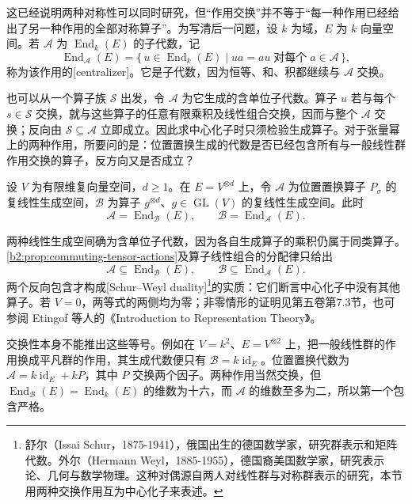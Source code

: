 这已经说明两种对称性可以同时研究，但“作用交换”并不等于“每一种作用已经给出了另一种作用的全部对称算子”。为写清后一问题，设 \(k\) 为域，\(E\) 为 \(k\) 向量空间。若 \(\mathcal A\) 为 \(\operatorname{End}_k(E)\) 的子代数，记
\[
	\operatorname{End}_{\mathcal A}(E) =\bigl\{\,u\in\operatorname{End}_k(E)\mid ua=au\;\text{对每个}\;a\in\mathcal A\,\bigr\},
\]
称为该作用的[centralizer]。它是子代数，因为恒等、和、积都继续与 \(\mathcal A\) 交换。

\ProseParagraphBreak
也可以从一个算子族 \(\mathcal S\) 出发，令 \(\mathcal A\) 为它生成的含单位子代数。算子 \(u\) 若与每个 \(s\in\mathcal S\) 交换，就与这些算子的任意有限乘积及线性组合交换，因而与整个 \(\mathcal A\) 交换；反向由 \(\mathcal S\subseteq\mathcal A\) 立即成立。因此求中心化子时只须检验生成算子。对于张量幂上的两种作用，所要问的是：位置置换生成的代数是否已经包含所有与一般线性群作用交换的算子，反方向又是否成立？

\begin{claim}\label{b2:claim:schur-weyl-preview}
	设 \(V\) 为有限维复向量空间，\(d\ge1\)。在 \(E=V^{\otimes d}\) 上，令 \(\mathcal A\) 为位置置换算子 \(P_\sigma\) 的复线性生成空间，\(\mathcal B\) 为算子 \(g^{\otimes d}\)、\(g\in\operatorname{GL}(V)\) 的复线性生成空间。此时
	\[
		\mathcal A=\operatorname{End}_{\mathcal B}(E),\qquad \mathcal B=\operatorname{End}_{\mathcal A}(E).
	\]
\end{claim}

两种线性生成空间确为含单位子代数，因为各自生成算子的乘积仍属于同类算子。\cref{b2:prop:commuting-tensor-actions}及算子线性组合的分配律只给出
\[
	\mathcal A\subseteq\operatorname{End}_{\mathcal B}(E),\qquad \mathcal B\subseteq\operatorname{End}_{\mathcal A}(E).
\]
两个反向包含才构成[Schur–Weyl duality]\footnote{舒尔（Issai Schur，1875-1941），俄国出生的德国数学家，研究群表示和矩阵代数。外尔（Hermann Weyl，1885-1955），德国裔美国数学家，研究表示论、几何与数学物理。这种对偶源自两人对线性群与对称群表示的研究，本节用两种交换作用互为中心化子来表述。}的实质：它们断言中心化子中没有其他算子。若 \(V=0\)，两等式的两侧均为零；非零情形的证明见第五卷第7.3节，也可参阅 Etingof 等人的《Introduction to Representation Theory》\cite[Theorem 5.18.4, p. 121; Proposition 5.19.1, p. 122]{EtingofEtAl2011RepresentationTheory}。

\ProseParagraphBreak
交换性本身不能推出这些等号。例如在 \(V=k^2\)、\(E=V^{\otimes2}\) 上，把一般线性群的作用换成平凡群的作用，其生成代数便只有 \(\mathcal B=k\operatorname{id}_E\)。位置置换代数为 \(\mathcal A=k\operatorname{id}_E+kP\)，其中 \(P\) 交换两个因子。两种作用当然交换，但 \(\operatorname{End}_{\mathcal B}(E)=\operatorname{End}_k(E)\) 的维数为十六，而 \(\mathcal A\) 的维数至多为二，所以第一个包含严格。

